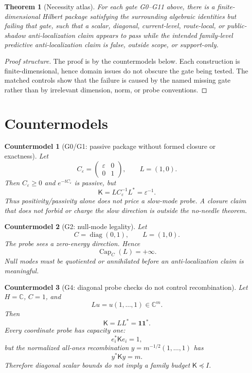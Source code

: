 \documentclass[11pt]{article}
\newtheorem{theorem}{Theorem}
\newtheorem{countermodel}{Countermodel}
\newcommand{\ALCap}{\operatorname{Cap}}
\newcommand{\Kmat}{\mathsf K}
\begin{document}
\begin{theorem}[Necessity atlas]
For each gate G0--G11 above, there is a finite-dimensional Hilbert package satisfying the surrounding algebraic identities but failing that gate, such that a scalar, diagonal, current-level, route-local, or public-shadow anti-localization claim appears to pass while the intended family-level predictive anti-localization claim is false, outside scope, or support-only.
\end{theorem}

\begin{proof}[Proof structure]
The proof is by the countermodels below.  Each construction is finite-dimensional, hence domain issues do not obscure the gate being tested.  The matched controls show that the failure is caused by the named missing gate rather than by irrelevant dimension, norm, or probe conventions.
\end{proof}

\section{Countermodels}

\begin{countermodel}[G0/G1: passive package without formed closure or exactness]
Let
\[
  C_\varepsilon=\begin{pmatrix}\varepsilon&0\\0&1\end{pmatrix},
  \qquad L=(1,0).
\]
Then \(C_\varepsilon\ge0\) and \(e^{-tC_\varepsilon}\) is passive, but
\[
  \Kmat=L C_\varepsilon^{-1}L^*=\varepsilon^{-1}.
\]
Thus positivity/passivity alone does not price a slow-mode probe.  A closure claim that does not forbid or charge the slow direction is outside the no-needle theorem.
\end{countermodel}

\begin{countermodel}[G2: null-mode legality]
Let
\[
  C=\operatorname{diag}(0,1),\qquad L=(1,0).
\]
The probe sees a zero-energy direction.  Hence
\[
  \ALCap_C(L)=+\infty.
\]
Null modes must be quotiented or annihilated before an anti-localization claim is meaningful.
\end{countermodel}

\begin{countermodel}[G4: diagonal probe checks do not control recombination]
Let \(H=\mathbb C\), \(C=1\), and
\[
  Lu=u(1,\ldots,1)\in\mathbb C^m.
\]
Then
\[
  \Kmat=LL^*=\mathbf 1\mathbf 1^*.
\]
Every coordinate probe has capacity one:
\[
  e_i^*\Kmat e_i=1,
\]
but the normalized all-ones recombination \(y=m^{-1/2}(1,\ldots,1)\) has
\[
  y^*\Kmat y=m.
\]
Therefore diagonal scalar bounds do not imply a family budget \(\Kmat\preceq I\).
\end{countermodel}
\end{document}
